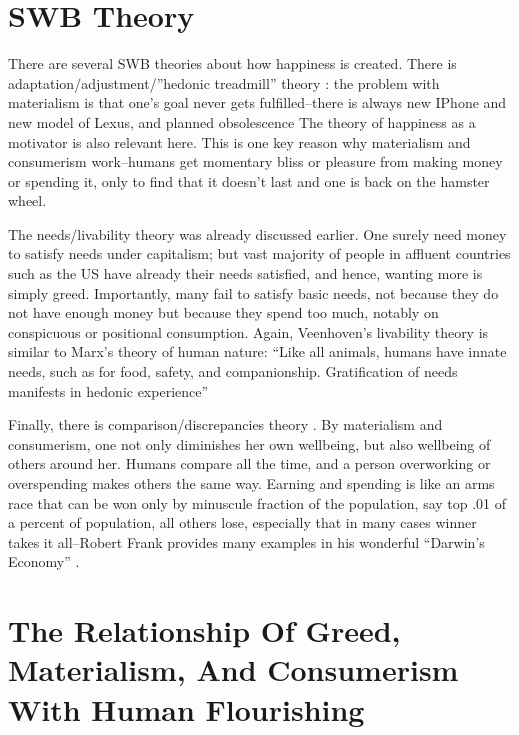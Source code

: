 \documentclass[10pt, letterpaper]{article}
\begin{document}
\begin{spacing}{1.8}
\section{SWB Theory}

There are several SWB theories about how happiness is created. There is  adaptation/adjustment/''hedonic
treadmill'' theory \citep{brickman78cj}: the problem with materialism is that one's goal never gets fulfilled--there is
always new IPhone and new model of Lexus, and planned obsolescence \citep{satyro2018planned,agrawal2016limits} %
%
The theory of happiness as a motivator \citep{carver90} is also relevant
here. This is one key reason why materialism and consumerism work--humans get
momentary bliss or pleasure from making money or spending it, only to find that
it doesn't last and one is back on the hamster wheel.

The needs/livability theory \citep{veenhoven95} was already discussed earlier. 
One surely need money to satisfy needs under capitalism; but
vast majority of people in affluent countries such as the US have already their
needs satisfied, and hence, wanting more is simply greed. Importantly, many fail to
satisfy basic needs, not because they do not have enough money but because they
spend too much, notably on conspicuous or positional consumption. 
%
Again, Veenhoven's  livability theory is similar to Marx's theory of human nature:
 ``Like all animals, humans have innate needs, such as for food, safety, and
 companionship. Gratification of needs manifests in hedonic
 experience''\citep{veenhoven14b}

Finally, there is  comparison/discrepancies theory \citep{michalos85}. By
materialism and consumerism, one not only diminishes her own wellbeing, but also
wellbeing of others around her. Humans compare all the time, and a person
overworking or overspending makes others the same way. Earning and spending is
like an arms race that can be won only by minuscule fraction of the population,
say top .01 of a percent of population, all others lose, especially that in many
cases winner takes it all--Robert Frank provides many examples in his wonderful
``Darwin's Economy'' \citeyear{frank12}. 

\section{The Relationship Of Greed, Materialism, And Consumerism With  Human Flourishing}



\end{spacing}
\end{document}
